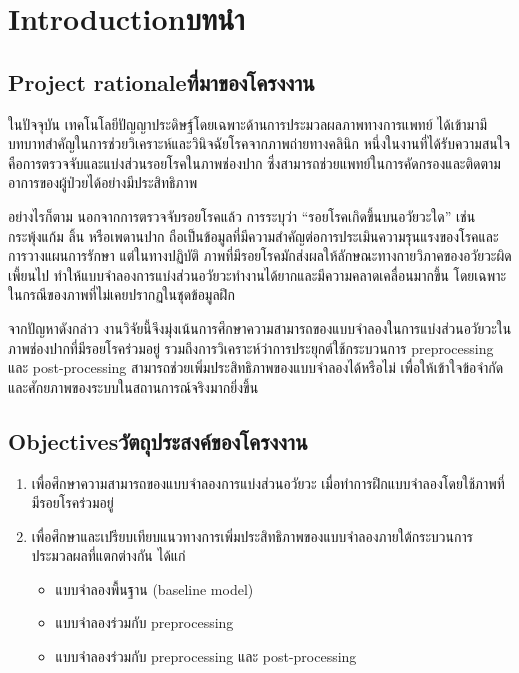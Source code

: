 \chapter{\ifenglish Introduction\else บทนำ\fi}

\section{\ifenglish Project rationale\else ที่มาของโครงงาน\fi}
\enskip ในปัจจุบัน เทคโนโลยีปัญญาประดิษฐ์โดยเฉพาะด้านการประมวลผลภาพทางการแพทย์ ได้เข้ามามีบทบาทสำคัญในการช่วยวิเคราะห์และวินิจฉัยโรคจากภาพถ่ายทางคลินิก หนึ่งในงานที่ได้รับความสนใจคือการตรวจจับและแบ่งส่วนรอยโรคในภาพช่องปาก ซึ่งสามารถช่วยแพทย์ในการคัดกรองและติดตามอาการของผู้ป่วยได้อย่างมีประสิทธิภาพ

อย่างไรก็ตาม นอกจากการตรวจจับรอยโรคแล้ว การระบุว่า “รอยโรคเกิดขึ้นบนอวัยวะใด” เช่น กระพุ้งแก้ม ลิ้น หรือเพดานปาก ถือเป็นข้อมูลที่มีความสำคัญต่อการประเมินความรุนแรงของโรคและการวางแผนการรักษา แต่ในทางปฏิบัติ ภาพที่มีรอยโรคมักส่งผลให้ลักษณะทางกายวิภาคของอวัยวะผิดเพี้ยนไป ทำให้แบบจำลองการแบ่งส่วนอวัยวะทำงานได้ยากและมีความคลาดเคลื่อนมากขึ้น โดยเฉพาะในกรณีของภาพที่ไม่เคยปรากฏในชุดข้อมูลฝึก

จากปัญหาดังกล่าว งานวิจัยนี้จึงมุ่งเน้นการศึกษาความสามารถของแบบจำลองในการแบ่งส่วนอวัยวะในภาพช่องปากที่มีรอยโรคร่วมอยู่ รวมถึงการวิเคราะห์ว่าการประยุกต์ใช้กระบวนการ preprocessing และ post-processing สามารถช่วยเพิ่มประสิทธิภาพของแบบจำลองได้หรือไม่ เพื่อให้เข้าใจข้อจำกัดและศักยภาพของระบบในสถานการณ์จริงมากยิ่งขึ้น

\section{\ifenglish Objectives\else วัตถุประสงค์ของโครงงาน\fi}
\begin{enumerate}
    \item เพื่อศึกษาความสามารถของแบบจำลองการแบ่งส่วนอวัยวะ เมื่อทำการฝึกแบบจำลองโดยใช้ภาพที่มีรอยโรคร่วมอยู่
    \item เพื่อศึกษาและเปรียบเทียบแนวทางการเพิ่มประสิทธิภาพของแบบจำลองภายใต้กระบวนการประมวลผลที่แตกต่างกัน ได้แก่
    \begin{itemize}
        \item แบบจำลองพื้นฐาน (baseline model)
        \item แบบจำลองร่วมกับ preprocessing
        \item แบบจำลองร่วมกับ preprocessing และ post-processing
    \end{itemize}
\end{enumerate}

